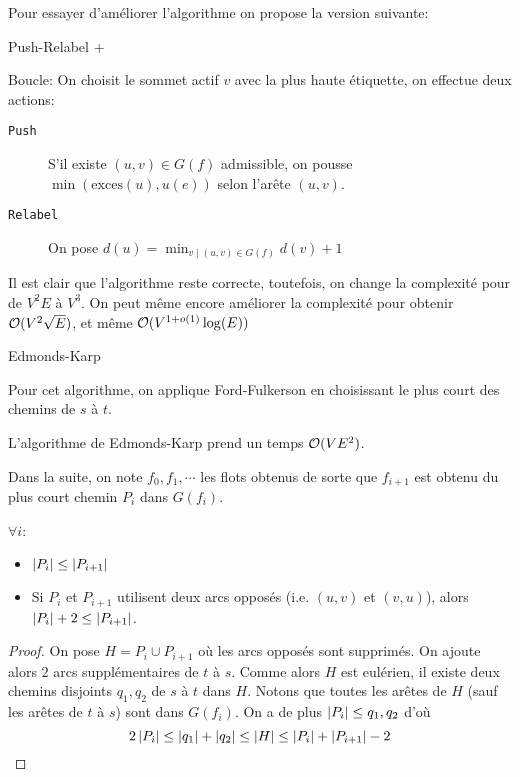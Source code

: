 \documentclass[math, info]{cours}
\begin{document}
Pour essayer d'améliorer l'algorithme on propose la version suivante:
\begin{algorithm}
	\caption{Push-Relabel +}
	\label{alg:pushrelabel+}
	Boucle: On choisit le sommet actif $v$ avec la plus haute étiquette, on effectue deux actions:
	\begin{description}
		\item[\tt Push] S'il existe $(u,v) \in G(f)$ admissible, on pousse $\min \left(\mathrm{exces}(u), u(e)\right)$ selon l'arête $(u, v)$.
		\item[\tt Relabel] On pose $d(u) = \min_{v\mid (u, v) \in G(f)}d(v) + 1$
	\end{description}
\end{algorithm}
Il est clair que l'algorithme reste correcte, toutefois, on change la complexité pour de $V^{2}E$ à $V^{3}$.
On peut même encore améliorer la complexité pour obtenir $\mathcal{O}(V^{2}\sqrt{E})$, et même $\mathcal{O}(V^{1 + o(1)}\log(E))$

\begin{algorithm}
	\caption{Edmonds-Karp}
	\label{alg:edmondskarp}
	Pour cet algorithme, on applique Ford-Fulkerson en choisissant le plus court des chemins de $s$ à $t$.
\end{algorithm}
\begin{thm}
	L'algorithme de Edmonds-Karp prend un temps $\mathcal{O}(VE^{2})$.
\end{thm}

Dans la suite, on note $f_{0}, f_{1},\cdots$ les flots obtenus de sorte que $f_{i + 1}$ est obtenu du plus court chemin $P_{i}$ dans $G(f_{i})$.

\begin{lemme}
	$\forall i$:
	\begin{itemize}
		\item $\left|P_{i}\right| \leq \left|P_{i + 1}\right|$
		\item Si $P_{i}$ et $P_{i + 1}$ utilisent deux arcs opposés (i.e. $(u, v)$ et $(v, u)$), alors $\left|P_{i}\right| + 2 \leq \left|P_{i + 1}\right|$.
	\end{itemize}
	\label{lem:edmondskarp1}
\end{lemme}
\begin{proof}
	On pose $H = P_{i} \cup P_{i + 1}$ où les arcs opposés sont supprimés.
	On ajoute alors $2$ arcs supplémentaires de $t$ à $s$.
	Comme alors $H$ est eulérien, il existe deux chemins disjoints $q_{1}, q_{2}$ de $s$ à $t$ dans $H$.
	Notons que toutes les arêtes de $H$ (sauf les arêtes de $t$ à $s$) sont dans $G(f_{i})$.
	On a de plus $\left|P_{i}\right| \leq q_{1}, q_{2}$ d'où
	\begin{equation*}
		2\left|P_{i}\right| \leq \left|q_{1}\right| + \left|q_{2}\right| \leq \left|H\right| \leq \left|P_{i}\right| + \left|P_{i + 1}\right| - 2
	\end{equation*}
\end{proof}
\end{document}
